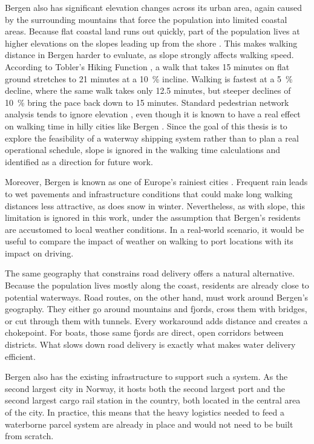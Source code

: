 \documentclass[12pt]{article}
\begin{document}
Bergen also has significant elevation changes across its urban area, again caused by the surrounding mountains that force the population into limited coastal areas. Because flat coastal land runs out quickly, part of the population lives at higher elevations on the slopes leading up from the shore \parencite{ulaads_bergen,bergencasestudy}. This makes walking distance in Bergen harder to evaluate, as slope strongly affects walking speed. According to Tobler's Hiking Function \parencite{walkingstats}, a walk that takes 15 minutes on flat ground stretches to 21 minutes at a \qty{10}{\percent} incline. Walking is fastest at a \qty{5}{\percent} decline, where the same walk takes only 12.5 minutes, but steeper declines of \qty{10}{\percent} bring the pace back down to 15 minutes. Standard pedestrian network analysis tends to ignore elevation \parencite{noslope}, even though it is known to have a real effect on walking time in hilly cities like Bergen \parencite{slopegood}. Since the goal of this thesis is to explore the feasibility of a waterway shipping system rather than to plan a real operational schedule, slope is ignored in the walking time calculations and identified as a direction for future work.

Moreover, Bergen is known as one of Europe's rainiest cities \parencite{BREMER2020100236}. Frequent rain leads to wet pavements and infrastructure conditions that could make long walking distances less attractive, as does snow in winter. Nevertheless, as with slope, this limitation is ignored in this work, under the assumption that Bergen's residents are accustomed to local weather conditions. In a real-world scenario, it would be useful to compare the impact of weather on walking to port locations with its impact on driving.

The same geography that constrains road delivery offers a natural alternative. Because the population lives mostly along the coast, residents are already close to potential waterways. Road routes, on the other hand, must work around Bergen's geography. They either go around mountains and fjords, cross them with bridges, or cut through them with tunnels. Every workaround adds distance and creates a chokepoint. For boats, those same fjords are direct, open corridors between districts. What slows down road delivery is exactly what makes water delivery efficient.

Bergen also has the existing infrastructure to support such a system. As the second largest city in Norway, it hosts both the second largest port \parencite{bergenport} and the second largest cargo rail station \parencite{bergenrail} in the country, both located in the central area of the city. In practice, this means that the heavy logistics needed to feed a waterborne parcel system are already in place and would not need to be built from scratch.
\end{document}
